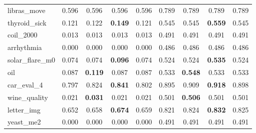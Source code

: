 \begin{figure}[ht]
\begin{tabular}{p{22mm}|*4{p{14mm}}|*4{p{14mm}}}
        libras\_move&\multicolumn{1}{c}{0.596}&\multicolumn{1}{c}{0.596}&\multicolumn{1}{c}{0.596}&\multicolumn{1}{c|}{0.596}&\multicolumn{1}{c}{0.789}&\multicolumn{1}{c}{0.789}&\multicolumn{1}{c}{0.789}&\multicolumn{1}{c}{0.789}\\
        thyroid\_sick&\multicolumn{1}{c}{0.121}&\multicolumn{1}{c}{0.122}&\multicolumn{1}{c}{\textbf{0.149}}&\multicolumn{1}{c|}{0.121}&\multicolumn{1}{c}{0.545}&\multicolumn{1}{c}{0.545}&\multicolumn{1}{c}{\textbf{0.559}}&\multicolumn{1}{c}{0.545}\\
        coil\_2000&\multicolumn{1}{c}{0.013}&\multicolumn{1}{c}{0.013}&\multicolumn{1}{c}{0.013}&\multicolumn{1}{c|}{0.013}&\multicolumn{1}{c}{0.491}&\multicolumn{1}{c}{0.491}&\multicolumn{1}{c}{0.491}&\multicolumn{1}{c}{0.491}\\
        arrhythmia&\multicolumn{1}{c}{0.000}&\multicolumn{1}{c}{0.000}&\multicolumn{1}{c}{0.000}&\multicolumn{1}{c|}{0.000}&\multicolumn{1}{c}{0.486}&\multicolumn{1}{c}{0.486}&\multicolumn{1}{c}{0.486}&\multicolumn{1}{c}{0.486}\\
        solar\_flare\_m0&\multicolumn{1}{c}{0.074}&\multicolumn{1}{c}{0.074}&\multicolumn{1}{c}{\textbf{0.096}}&\multicolumn{1}{c|}{0.074}&\multicolumn{1}{c}{0.524}&\multicolumn{1}{c}{0.524}&\multicolumn{1}{c}{\textbf{0.535}}&\multicolumn{1}{c}{0.524}\\
        oil&\multicolumn{1}{c}{0.087}&\multicolumn{1}{c}{\textbf{0.119}}&\multicolumn{1}{c}{0.087}&\multicolumn{1}{c|}{0.087}&\multicolumn{1}{c}{0.533}&\multicolumn{1}{c}{\textbf{0.548}}&\multicolumn{1}{c}{0.533}&\multicolumn{1}{c}{0.533}\\
        car\_eval\_4&\multicolumn{1}{c}{0.797}&\multicolumn{1}{c}{0.824}&\multicolumn{1}{c}{\textbf{0.841}}&\multicolumn{1}{c|}{0.802}&\multicolumn{1}{c}{0.895}&\multicolumn{1}{c}{0.909}&\multicolumn{1}{c}{\textbf{0.918}}&\multicolumn{1}{c}{0.898}\\
        wine\_quality&\multicolumn{1}{c}{0.021}&\multicolumn{1}{c}{\textbf{0.031}}&\multicolumn{1}{c}{0.021}&\multicolumn{1}{c|}{0.021}&\multicolumn{1}{c}{0.501}&\multicolumn{1}{c}{\textbf{0.506}}&\multicolumn{1}{c}{0.501}&\multicolumn{1}{c}{0.501}\\
        letter\_img&\multicolumn{1}{c}{0.652}&\multicolumn{1}{c}{0.658}&\multicolumn{1}{c}{\textbf{0.674}}&\multicolumn{1}{c|}{0.659}&\multicolumn{1}{c}{0.821}&\multicolumn{1}{c}{0.824}&\multicolumn{1}{c}{\textbf{0.832}}&\multicolumn{1}{c}{0.825}\\
        yeast\_me2&\multicolumn{1}{c}{0.000}&\multicolumn{1}{c}{0.000}&\multicolumn{1}{c}{0.000}&\multicolumn{1}{c|}{0.000}&\multicolumn{1}{c}{0.491}&\multicolumn{1}{c}{0.491}&\multicolumn{1}{c}{0.491}&\multicolumn{1}{c}{0.491}\\

\end{tabular}
\end{figure}
